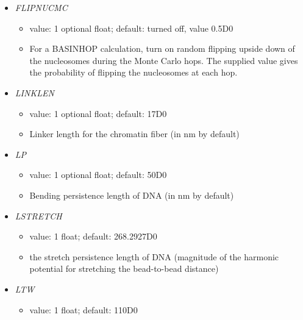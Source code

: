 \documentclass[12pt,dvips]{article}
\begin{document}
\begin{itemize}
\begin{itemize}
  \end{itemize}
%
\item {\it FLIPNUCMC}
  \begin{itemize}
    \item value: 1 optional float; default: turned off, value 0.5D0
    \item For a BASINHOP calculation, turn on random flipping upside down of the nucleosomes during the Monte Carlo hops. The supplied value gives the probability of flipping the nucleosomes at each hop. 
  \end{itemize}
%
%
\item {\it LINKLEN}
  \begin{itemize}
    \item value: 1 optional float; default: 17D0
    \item Linker length for the chromatin fiber (in nm by default)
  \end{itemize}
%
\item {\it LP}
  \begin{itemize}
    \item value: 1 optional float; default: 50D0
    \item Bending persistence length of DNA (in nm by default)
  \end{itemize}
%
\item {\it LSTRETCH}
  \begin{itemize}
    \item value: 1 float; default: 268.2927D0
    \item the stretch persistence length of DNA (magnitude of the harmonic potential for stretching the bead-to-bead distance)
  \end{itemize}
%
\item {\it LTW}
  \begin{itemize}
    \item value: 1 float; default: 110D0

\end{itemize}
\end{itemize}
\end{document}
